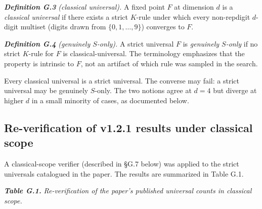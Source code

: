 \documentclass[11pt,letterpaper]{article}
\theoremstyle{paperstyle}
\theoremstyle{paperstyledef}
\theoremstyle{paperstylerem}
\begin{document}
\textbf{\emph{Definition G.3}} \emph{(classical universal).} A fixed
point \(F\) at dimension \(d\) is a \emph{classical universal} if there
exists a strict \(K\)-rule under which every non-repdigit \(d\)-digit
multiset (digits drawn from \(\{0, 1, \ldots, 9\}\)) converges to \(F\).

\textbf{\emph{Definition G.4}} \emph{(genuinely \(S\)-only).} A strict
universal \(F\) is \emph{genuinely \(S\)-only} if no strict \(K\)-rule
for \(F\) is classical-universal. The terminology emphasizes that the
property is intrinsic to \(F\), not an artifact of which rule was
sampled in the search.

Every classical universal is a strict universal. The converse may fail:
a strict universal may be genuinely \(S\)-only. The two notions agree at
\(d = 4\) but diverge at higher \(d\) in a small minority of cases, as
documented below.

\hypertarget{g.3-re-verification-of-v1.2.1-results-under-classical-scope}{%
\subsection{Re-verification of v1.2.1 results under classical scope}\label{g.3-re-verification-of-v1.2.1-results-under-classical-scope}}

A classical-scope verifier (described in §G.7 below) was applied to the
strict universals catalogued in the paper. The results are summarized in
Table G.1.

\textbf{\emph{Table G.1.}} \emph{Re-verification of the paper's
published universal counts in classical scope.}
\end{document}
